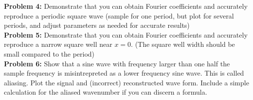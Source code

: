 \documentclass[12pt]{article}
\begin{document}
\noindent
{\bf Problem 4:} Demonstrate that you can obtain Fourier coefficients and accurately reproduce a periodic square wave (sample for one period, but plot for several periods, and adjust parameters as needed for accurate results) \\[3pt]

\noindent
{\bf Problem 5:} Demonstrate that you can obtain Fourier coefficients and accurately reproduce a narrow square well near $x=0$. (The square well width should be small compared to the period)\\[3pt]

\noindent
{\bf Problem 6:} Show that a sine wave with frequency larger than one
half the sample frequency is misintrepreted as a lower frequency sine
wave.  This is called aliasing.  Plot the signal and (incorrect)
reconstructed wave form.  Include a simple calculation for the aliased wavenumber if you can discern a formula.\\[3pt]
\end{document}
